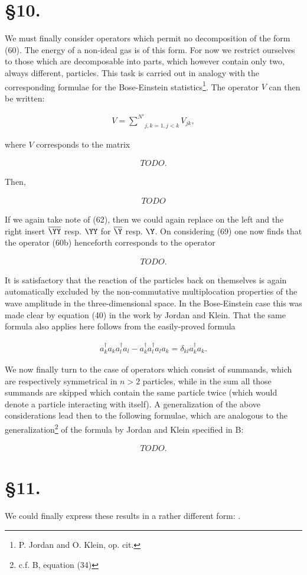 \documentclass{article}
\newcommand{\nequ}[2]{
\begin{align*}
#1
\tag{#2}
\end{align*}
}
\newcommand{\uequ}[1]{
\begin{align*}
#1
\end{align*}
}
\newcommand{\sumXY}[2]{\underset{#1}{\overset{#2}{\sum}}}
\begin{document}
\section*{§10.}
We must finally consider operators which permit no decomposition of the form (60). The energy of a non-ideal gas is of this form. For now we restrict ourselves to those which are decomposable into parts, which however contain only two, always different, particles. This task is carried out in analogy with the corresponding formulae for the Bose-Einstein statistics\footnote{P. Jordan and O. Klein, op. cit.}. The operator $V$ can then be written:
\nequ{
V=\sumXY{j,k=1, j<k}{N'}V_{jk},
}{60b}
where $V$ corresponds to the matrix
\nequ{TODO.}{63b}
Then,
\nequ{TODO}{64b}

If we again take note of (62), then we could again replace on the left and the right insert $\overline{\YY}$ resp. $\YY$ for $\overline{\Y}$ resp. $\Y$. On considering (69) one now finds that the operator (60b) henceforth corresponds to the operator
\nequ{TODO.}{66b}

It is satisfactory that the reaction of the particles back on themselves is again automatically excluded by the non-commutative multiplocation properties of the wave amplitude in the three-dimensional space. In the Bose-Einstein case this was made clear by equation (40) in the work by Jordan and Klein. That the same formula also applies here follows from the easily-proved formula
\uequ{
a^\dagger_k a_k a^\dagger_l a_l - a^\dagger_k a^\dagger_l a_l a_k = \delta_{kl} a^\dagger_k a_k.
}

We now finally turn to the case of operators which consist of summands, which are respectively symmetrical in $n>2$ particles, while in the sum all those summands are skipped which contain the same particle twice (which would denote a particle interacting with itself). A generalization of the above considerations lead then to the following formulae, which are analogous to the generalization\footnote{c.f. B, equation (34)} of the formula by Jordan and Klein specified in B:
\nequ{TODO.}{66c}

\section*{§11.}
We could finally express these results in a rather different form: .
\end{document}
